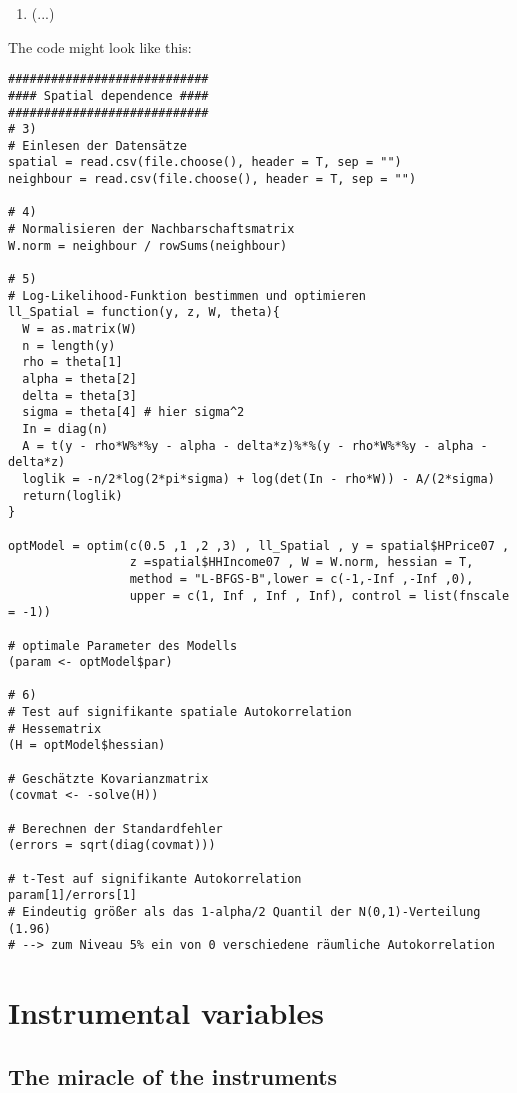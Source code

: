 \documentclass{article}
\begin{document}
\begin{solution}
\begin{enumerate}
\item (...)
\end{enumerate}

The code might look like this:
\begin{verbatim}
############################
#### Spatial dependence ####
############################
# 3)
# Einlesen der Datensätze
spatial = read.csv(file.choose(), header = T, sep = "")
neighbour = read.csv(file.choose(), header = T, sep = "")

# 4)
# Normalisieren der Nachbarschaftsmatrix
W.norm = neighbour / rowSums(neighbour)

# 5)
# Log-Likelihood-Funktion bestimmen und optimieren
ll_Spatial = function(y, z, W, theta){
  W = as.matrix(W)
  n = length(y)
  rho = theta[1]
  alpha = theta[2]
  delta = theta[3]
  sigma = theta[4] # hier sigma^2
  In = diag(n)
  A = t(y - rho*W%*%y - alpha - delta*z)%*%(y - rho*W%*%y - alpha - delta*z)
  loglik = -n/2*log(2*pi*sigma) + log(det(In - rho*W)) - A/(2*sigma)
  return(loglik)
}

optModel = optim(c(0.5 ,1 ,2 ,3) , ll_Spatial , y = spatial$HPrice07 ,
                 z =spatial$HHIncome07 , W = W.norm, hessian = T,
                 method = "L-BFGS-B",lower = c(-1,-Inf ,-Inf ,0),
                 upper = c(1, Inf , Inf , Inf), control = list(fnscale = -1))

# optimale Parameter des Modells
(param <- optModel$par)

# 6)
# Test auf signifikante spatiale Autokorrelation
# Hessematrix
(H = optModel$hessian)

# Geschätzte Kovarianzmatrix
(covmat <- -solve(H))

# Berechnen der Standardfehler
(errors = sqrt(diag(covmat)))

# t-Test auf signifikante Autokorrelation
param[1]/errors[1]
# Eindeutig größer als das 1-alpha/2 Quantil der N(0,1)-Verteilung (1.96)
# --> zum Niveau 5% ein von 0 verschiedene räumliche Autokorrelation
\end{verbatim}
\end{solution}

\newpage
\section{Instrumental variables\label{ivestimation}}



\subsection{The miracle of the instruments}
\end{document}

